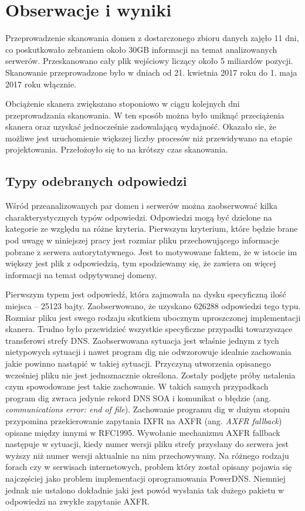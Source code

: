 \chapter{Obserwacje i wyniki}
Przeprowadzenie skanowania domen z dostarczonego zbioru danych zajęło 11 dni, co poskutkowało zebraniem około 30GB informacji na temat analizowanych serwerów. Przeskanowano cały plik wejściowy liczący około 5 miliardów pozycji. Skanowanie przeprowadzone było w dniach od 21. kwietnia 2017 roku do 1. maja 2017 roku włącznie. 

Obciążenie skanera zwiększano stoponiowo w ciągu kolejnych dni przeprowadzania skanowania. W ten sposób można było uniknąć przeciążenia skanera oraz uzyskać jednocześnie zadowalającą wydajność. Okazało sie, że możliwe jest uruchomienie większej liczby procesów niż przewidywano na etapie projektowania. Przełożoyło się to na krótszy czas skanowania.

\section{Typy odebranych odpowiedzi}
Wśród przeanalizowanych par domen i serwerów można zaobserwować kilka charakterystycznych typów odpowiedzi. Odpowiedzi mogą być dzielone na kategorie ze względu na różne kryteria. Pierwszym kryterium, które będzie brane pod uwagę w niniejszej pracy jest rozmiar pliku przechowującego informacje pobrane z serwera autorytatywnego. Jest to motywowane faktem, że w istocie im większy jest plik z odpowiedzią, tym spodziewamy się, że zawiera on więcej informacji na temat odpytywanej domeny. 

Pierwszym typem jest odpowiedź, która zajmowała na dysku specyficzną ilość miejsca -- 25123 bajty. Zaobserwowano, że uzyskano 626288 odpowiedzi tego typu. Rozmiar pliku jest swego rodzaju skutkiem ubocznym uproszczonej implementacji skanera. Trudno było przewidzieć wszystkie specyficzne przypadki towarzyszące transferowi strefy DNS. Zaobserwowana sytuacja jest właśnie jednym z tych nietypowych sytuacji i nawet program dig nie odwzorowuje idealnie zachowania jakie powinno nastąpić w takiej sytuacji. Przyczyną utworzenia opisanego wcześniej pliku nie jest jednoznacznie określona. Zostały podjęte próby ustalenia czym spowodowane jest takie zachowanie. W takich samych przypadkach program dig zwraca jedynie rekord DNS SOA i komunikat o błędzie (ang. \textit{communications error: end of file}). Zachowanie programu dig w dużym stopniu przypomina przekierowanie zapytania IXFR na AXFR (ang. \textit{AXFR fallback}) opisane między innymi w RFC1995\cite{RFC1995}. Wywołanie mechanizmu AXFR fallback następuje w sytuacji, kiedy numer wersji pliku strefy przysłany do serwera jest wyższy niż numer wersji aktualnie na nim przechowywany. Na różnego rodzaju forach\cite{powerdns-forum} czy w serwisach internetowych\cite{powerdns-git}, problem który został opisany pojawia się najczęściej jako problem implementacji oprogramowania PowerDNS\cite{powerdns}. Niemniej jednak nie ustalono dokładnie jaki jest powód wysłania tak dużego pakietu w odpowiedzi na zwykłe zapytanie AXFR.

